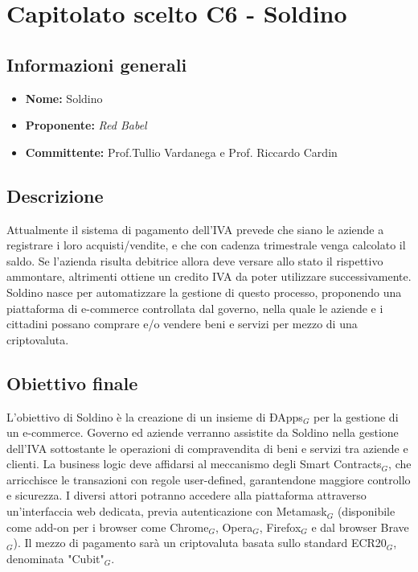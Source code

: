\section{Capitolato scelto C6 - Soldino}
\subsection{Informazioni generali}
% 
\begin{itemize}
\item
\textbf{Nome:} Soldino
\item
\textbf{Proponente:} \textit{Red Babel} 
\item
\textbf{Committente:} Prof.Tullio Vardanega e Prof. Riccardo Cardin
\end{itemize}
\subsection{Descrizione}
Attualmente il sistema di pagamento dell'IVA prevede che siano le aziende a registrare i loro acquisti/vendite, e che con cadenza trimestrale venga calcolato il saldo. Se l'azienda risulta debitrice allora deve versare allo stato il rispettivo ammontare, altrimenti ottiene un credito IVA da poter utilizzare successivamente. \\Soldino nasce per automatizzare la gestione di questo processo, proponendo una piattaforma di e-commerce controllata dal governo, nella quale le aziende e i cittadini possano comprare e/o vendere beni e servizi per mezzo di una criptovaluta.

\subsection{Obiettivo finale}
L'obiettivo di Soldino è la creazione di un insieme di ÐApps$_{G}$ per la gestione di un e-commerce. Governo ed aziende verranno assistite da Soldino nella gestione dell'IVA sottostante le operazioni di compravendita di beni e servizi tra aziende e clienti. La business logic deve affidarsi al meccanismo degli Smart Contracts$_{G}$, che arricchisce le transazioni con regole user-defined, garantendone maggiore controllo e sicurezza. I diversi attori potranno accedere alla piattaforma attraverso un'interfaccia web dedicata, previa autenticazione con Metamask$_G$ (disponibile come add-on per i browser come Chrome$_{G}$, Opera$_{G}$, Firefox$_{G}$ e dal browser Brave$_{G}$).  Il mezzo di pagamento sarà un criptovaluta basata sullo standard ECR20$_{G}$, denominata "Cubit"$_{G}$.

